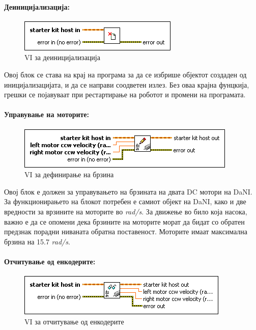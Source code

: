 \documentclass[12pt]{article}
\begin{document}
    \paragraph{Деиницијализација:\\}
			\begin{figure}[h]
				\includegraphics[width = 0.45\linewidth]{./images/deinit.png}
				\raggedright
				\caption{VI за деиницијализација}
				\label{fig:deinit.png}
				\end{figure}

      Овој блок се става на крај на програма за да се избрише објектот создаден од иницијализацијата, и да се направи соодветен излез. Без оваа крајна фунцкија, грешки се појавуваат при рестартирање на роботот и промени на програмата.
			\\

    \paragraph{Управување на моторите:\\}
      \begin{figure}[h]
				\includegraphics[width=0.45\linewidth]{./images/write_dc.png}
				\raggedright
				\caption{VI за дефинирање на брзина}
				\label{fig:write_dc.png}
				\end{figure}

			Овој блок е должен за управувањето на брзината на двата DC мотори на DaNI. За функционирањето на блокот потребен е самиот објект на DaNI, како и две вредности за врзините на моторите во \textit{rad/s}. За движење во било која насока, важно е да се опомени дека брзините на моторите морат да бидат со обратен предзнак порадни ниваната обратна поставеност. Моторите имаат максимална брзина на 15.7 \textit{rad/s}.

		\paragraph{Отчитување од енкодерите:\\}
			\begin{figure}[h]
				\includegraphics[width=0.45\linewidth]{./images/read_dc.png}
				\raggedright
				\caption{VI за отчитување од енкодерите}
				\label{fig:read_dc.png}
				\end{figure}
\end{document}
